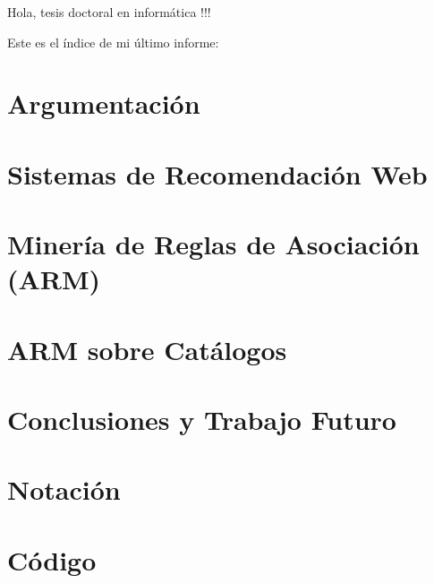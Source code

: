 \documentclass[utf8]{book}
\begin{document}
Hola, tesis doctoral en informática !!!
\newpage

%


Este es el índice de mi último informe: 

\tableofcontents

\chapter*{Argumentación}
\label{chap:argumentacion}





\chapter{Sistemas de Recomendación Web}
\label{chap:SRW}





\chapter{Minería de Reglas de Asociación (ARM)}
\label{chap:arm}





\chapter{ARM sobre Catálogos}
\label{chap:catalogos}





\chapter{Conclusiones y Trabajo Futuro}
\label{chap:conclusiones-y-trabajo-futuro}




\appendix
\chapter{Notación}
\label{apdx:notacion}


\chapter{Código}
\label{apdx:codigo}


\listoffigures

\listoftables
\end{document}
